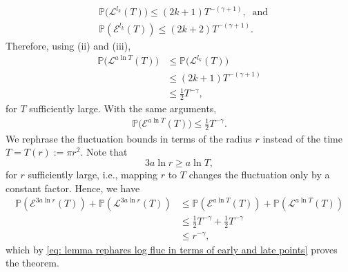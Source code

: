 \documentclass[11pt]{article}
\makeatletter
\renewenvironment{proof}[1][\proofname]{
   \par\pushQED{\qed}\normalfont
   \topsep6\p@\@plus6\p@\relax
   \trivlist\item[\hskip\labelsep\bfseries#1\@addpunct{.}]
   \ignorespaces
}{
   \popQED\endtrivlist\@endpefalse
}
\numberwithin{equation}{section}
\makeatother
\begin{document}
\begin{proof}[Proof of Theorem \ref{log fluctuation}]
  \begin{equation}\nonumber
    \begin{split}
      & \mathbb{P} \big( \mathcal{L}^{l_k}(T) \big) 
          \leq (2k+1) T^{-(\gamma + 1)}, \; \; \text{and}\\
      & \mathbb{P}(\mathcal{E}^{l_k}(T)) 
      \leq (2k+2) T^{-(\gamma + 1)}.
    \end{split}
  \end{equation}
  Therefore, using (ii) and (iii),
  \begin{equation}\nonumber
  \begin{split}
    \mathbb{P} \big(\mathcal{L}^{a \ln T}(T) \big)
    & \leq \mathbb{P}\big(\mathcal{L}^{l_k}(T) \big)\\
    & \leq (2k+1) T^{-(\gamma + 1)} \\
    & \leq \frac{1}{2} T^{-\gamma}, 
  \end{split}
  \end{equation}
  for $T$ sufficiently large. With the same arguments,
  \begin{equation}\nonumber
  \begin{split}
    \mathbb{P} \big(\mathcal{E}^{a \ln T}(T) \big)
      \leq \frac{1}{2} T^{-\gamma}. 
  \end{split}
  \end{equation}
  We rephrase the fluctuation bounds in terms of the radius $r$ instead of the time $T = T(r):= \pi r^2$.
  Note that
  $$
    3a \ln r \geq a \ln T,
  $$
  for $r$ sufficiently large, i.e., mapping $r$ to $T$ changes the fluctuation only by a constant factor. 
  Hence, we have
  \begin{equation} \nonumber
  \begin{split}
    \mathbb{P} (\mathcal{E}^{3a \ln r}(T)) 
      + \mathbb{P} (\mathcal{L}^{3a \ln r}(T)) 
    & \leq \mathbb{P} (\mathcal{E}^{a \ln T}(T)) 
      + \mathbb{P} (\mathcal{L}^{a \ln T}(T)) \\
    & \leq \frac{1}{2} T^{-\gamma} + \frac{1}{2} T^{-\gamma} \\
    & \leq r^{-\gamma},
  \end{split}
  \end{equation}
  which by \eqref{eq: lemma rephares log fluc in terms of early and late points} 
  proves the theorem. 


\end{proof}
\end{document}

